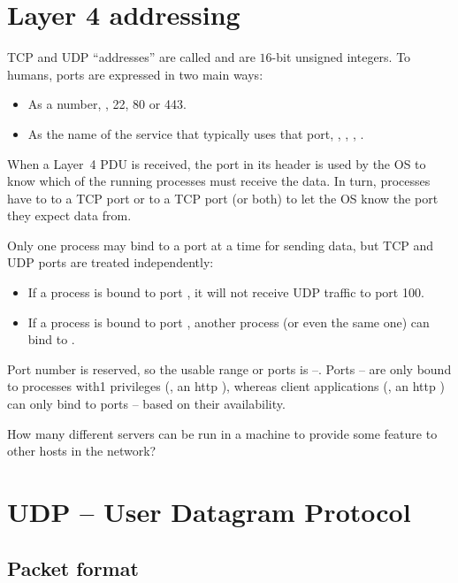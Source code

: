 \section{Layer 4 addressing}

TCP and UDP ``addresses'' are called  and are $16$-bit unsigned integers.
To humans, ports are expressed in two main ways:
\begin{itemize}
\item As a number, \eg, 22, 80 or 443.
\item As the name of the service that typically uses that port, \eg, , , .
\end{itemize}

When a Layer~4 PDU is received, the port in its header is used by the OS to know which of the running 
processes must receive the data. 
In turn, processes have to  to a TCP port or to a TCP port (or both)
to let the OS know the port they expect data from.

Only one process may bind to a port at a time for sending data, but TCP and UDP ports
are treated independently:
\begin{itemize}
 \item If a process is bound to port , it will not receive UDP traffic to port 100.
 \item If a process is bound to port , another process (or even the same one) can 
   bind to .  
\end{itemize}

Port number  is reserved, so the usable range or ports is --. 
Ports -- are only bound to 
processes with1 privileges (\eg, an http ), whereas client applications (\eg, an http ) 
can only bind to ports -- based on their availability.

\begin{exercise}
How many different servers can be run in a machine to provide some feature to other hosts in the network?
\end{exercise}


\section{UDP -- User Datagram Protocol}
\subsection{Packet format}

